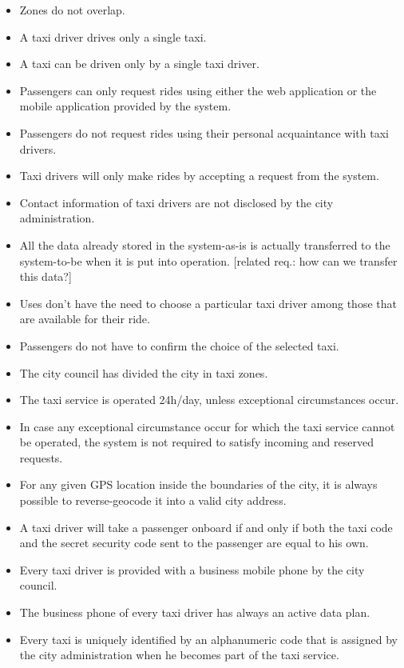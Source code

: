 \begin{itemize}
\item Zones do not overlap.
\item A taxi driver drives only a single taxi.
\item A taxi can be driven only by a single taxi driver.
\item Passengers can only request rides using either the web application or the mobile application provided by the system.
\item Passengers do not request rides using their personal acquaintance with taxi drivers.
\item Taxi drivers will only make rides by accepting a request from the system.
\item Contact information of taxi drivers are not disclosed by the city administration.
\item All the data already stored in the system-as-is is actually transferred to the system-to-be when it is put into operation. [related req.: how can we transfer this data?]
\item Uses don't have the need to choose a particular taxi driver among those that are available for their ride.
\item Passengers do not have to confirm the choice of the selected taxi.
\item The city council has divided the city in taxi zones.
\item The taxi service is operated 24h/day, unless exceptional circumstances occur.
\item In case any exceptional circumstance occur for which the taxi service cannot be operated, the system is not required to satisfy incoming and reserved requests. 
\item For any given GPS location inside the boundaries of the city, it is always possible to reverse-geocode it into a valid city address. 
\item A taxi driver will take a passenger onboard if and only if both the taxi code and the secret security code sent to the passenger are equal to his own. 

\item Every taxi driver is provided with a business mobile phone by the city council.
\item The business phone of every taxi driver has always an active data plan.
\item Every taxi is uniquely identified by an alphanumeric code that is assigned by the city administration when he becomes part of the taxi service.
\end{itemize}

